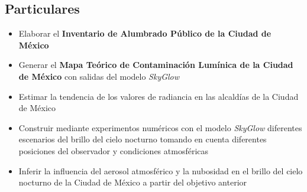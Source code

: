 \vspace{5mm}

\subsection{Particulares}

\begin{itemize}

    \item Elaborar el \textbf{Inventario de Alumbrado Público de la Ciudad de México}
    
    \item Generar el \textbf{Mapa Teórico de Contaminación Lumínica de la Ciudad de México} con salidas del modelo \textit{SkyGlow} 
    
    \item Estimar la tendencia de los valores de radiancia en las alcaldías de la Ciudad de México
    
    \item Construir mediante experimentos numéricos con el modelo \textit{SkyGlow} diferentes escenarios del brillo del cielo nocturno tomando en cuenta diferentes posiciones del observador y condiciones atmosféricas
    
    \item Inferir la influencia del aerosol atmosférico  y la nubosidad en el brillo del cielo nocturno de la Ciudad de México a partir del objetivo anterior
    
    
\end{itemize}